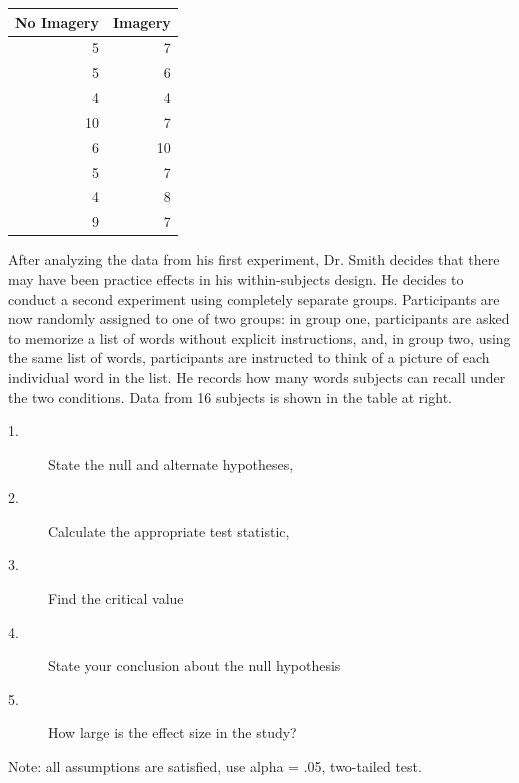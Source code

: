 \documentclass{tufte-handout}
\begin{document}
\begin{margintable}[20pt]
  \selectfont
  \begin{tabular}{rr}
    \toprule
No Imagery & Imagery\\
    \midrule
5&	7\\
5&	6\\
4&	4\\
10&	7\\
6&	10\\
5&	7\\
4&	8\\
9&	7\\
    \bottomrule
  \end{tabular}
  \label{tab:normaltab}
\end{margintable}

After analyzing the data from his first experiment, Dr. Smith decides that there may have been practice effects in his within-subjects design. He decides to conduct a second experiment using completely separate groups. Participants are now randomly assigned to one of two groups: in group one, participants are asked to memorize a list of words without explicit instructions, and, in group two, using the same list of words, participants are instructed to think of a picture of each individual word in the list. He records how many words subjects can recall under the two conditions. Data from 16 subjects is shown in the table at right.

\begin{description}
\item[1.] State the null and alternate hypotheses, 
\item[2.] Calculate the appropriate test statistic, 
\item[3.] Find the critical value 
\item[4.] State your conclusion about the null hypothesis 
\item[5.] How large is the effect size in the study?
\end{description}

Note: all assumptions are satisfied, use alpha = .05, two-tailed test.

\pagebreak
\end{document}
